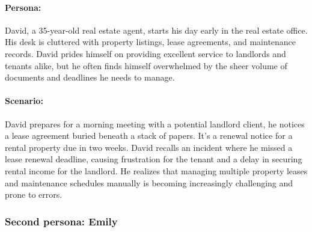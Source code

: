 \begin{minipage}[t]{0.65\textwidth} %
	\paragraph{Persona:\newline}
	\vspace{0pt} %
	\noindent
	\vbox{
	 \vspace{5pt}
	 David, a 35-year-old real estate agent, starts his day early in the real estate office. His desk is cluttered with property listings, lease agreements, and maintenance records. David prides himself on providing excellent service to landlords and tenants alike, but he often finds himself overwhelmed by the sheer volume of documents and deadlines he needs to manage.
	}
	\paragraph{Scenario:\\}
	\vspace{0pt} %
	\noindent
	\vbox{
	 \vspace{5pt}
	 David prepares for a morning meeting with a potential landlord client, he notices a lease agreement buried beneath a stack of papers. It's a renewal notice for a rental property due in two weeks. David recalls an incident where he missed a lease renewal deadline, causing frustration for the tenant and a delay in securing rental income for the landlord. He realizes that managing multiple property leases and maintenance schedules manually is becoming increasingly challenging and prone to errors.
	}
\end{minipage}

\subsubsection{Second persona: Emily}


